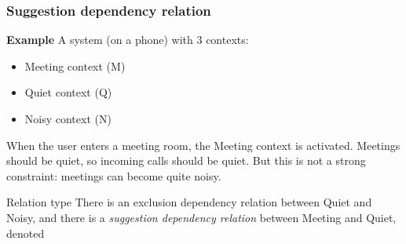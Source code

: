 \begin{frame}[noframenumbering]
	\frametitle{Suggestion dependency relation}

	\textbf{Example} A system (on a phone) with 3 contexts:

	\begin{itemize}
		\item Meeting context (M)
		\item Quiet context (Q)
		\item Noisy context (N)
	\end{itemize}

	When the user enters a meeting room, the Meeting context is activated.
	Meetings should be quiet, so incoming calls should be quiet. But this is
	not a strong constraint: meetings can become quite noisy.

	\begin{exampleblock}{Relation type}
		There is an exclusion dependency relation between Quiet and Noisy, and
		there is a \textit{suggestion dependency relation} between Meeting and Quiet,
		denoted 
	\end{exampleblock}
\end{frame}
